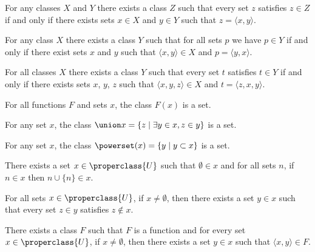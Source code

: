 \begin{node}[Axioms]
\begin{node}\label{nbg-000H}%
For any classes $X$ and $Y$ there exists a class $Z$ such that every set
$z$ satisfies $z\in Z$ if and only if there exists sets $x\in X$ and
$y\in Y$ such that $z=\langle x,y\rangle$.
\end{node}

\begin{node}\label{nbg-000C}%
For any class $X$ there exists a class $Y$ such that for all sets $p$ we
have $p\in Y$ if and only if there exist sets $x$ and $y$ such that
$\langle x,y\rangle\in X$ and $p=\langle y,x\rangle$.
\end{node}

\begin{node}\label{nbg-000I}%
For all classes $X$ there exists a class $Y$ such that every set $t$
satisfies $t\in Y$ if and only if there exists sets $x$, $y$, $z$ such
that $\langle x,y,z\rangle\in X$ and $t=\langle z,x,y\rangle$.
\end{node}

\begin{node}\label{nbg-000J}%
For all functions $F$ and sets $x$, the class $F(x)$ is a set.
\end{node}

\begin{node}\label{nbg-000K}%
For any set $x$, the class $\union x=\{z\mid\exists y\in x,z\in y\}$
is a set.
\end{node}

\begin{node}\label{nbg-000L}%
For any set $x$, the class $\powerset(x)=\{y\mid y\subset x\}$ is a set.
\end{node}

\begin{node}\label{nbg-000M}%
There exists a set $x\in\properclass{U}$ such that $\emptyset\in x$
and for all sets $n$, if $n\in x$ then $n\cup\{n\}\in x$.
\end{node}

\begin{node}\label{nbg-000N}%
For all sets $x\in\properclass{U}$, if $x\neq\emptyset$, then there exists a
set $y\in x$ such that every set $z\in y$ satisfies $z\notin x$.
\end{node}

\begin{node}\label{nbg-000O}%
There exists a class $F$ such that $F$ is a function and for every set
$x\in\properclass{U}$, if $x\neq\emptyset$, then there exists a set $y\in x$
such that $\langle x,y\rangle\in F$.
\end{node}
\end{node}

